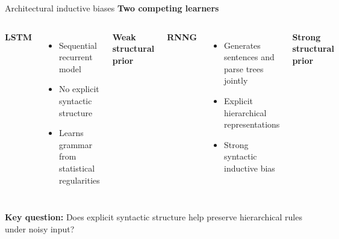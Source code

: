 \begin{frame}{Architectural inductive biases}
  \textbf{Two competing learners}

  \vspace{0.2cm}
  \begin{columns}[T]
    \textbf{LSTM}
    \begin{itemize}
      \item Sequential recurrent model
      \item No explicit syntactic structure
      \item Learns grammar from statistical regularities
    \end{itemize}
    \centering\vspace{0.2cm}
    \textbf{Weak structural prior}

    \textbf{RNNG}
    \begin{itemize}
      \item Generates sentences and parse trees jointly
      \item Explicit hierarchical representations
      \item Strong syntactic inductive bias
    \end{itemize}
    \centering\vspace{0.2cm}
    \textbf{Strong structural prior}
  \end{columns}

  \vspace{0.4cm}
  \begin{center}
    \textbf{Key question:} Does explicit syntactic structure help preserve
    hierarchical rules under noisy input?
  \end{center}
\end{frame}

